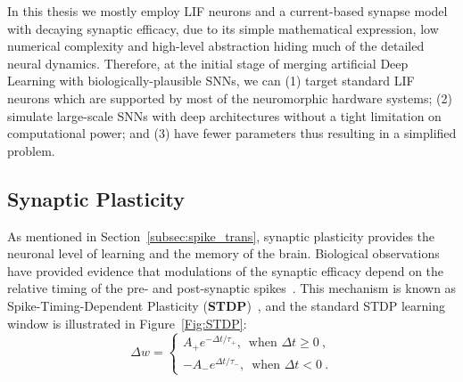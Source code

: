 In this thesis we mostly employ LIF neurons and a current-based synapse model with decaying synaptic efficacy, due to its simple mathematical expression, low numerical complexity and high-level abstraction hiding much of the detailed neural dynamics.
Therefore, at the initial stage of merging artificial Deep Learning with biologically-plausible SNNs, we can (1) target standard LIF neurons which are supported by most of the neuromorphic hardware systems; (2) simulate large-scale SNNs with deep architectures without a tight limitation on computational power; and (3) have fewer parameters thus resulting in a simplified problem.


\subsection{Synaptic Plasticity}
\label{subsec:STDP}
As mentioned in Section~\ref{subsec:spike_trans}, synaptic plasticity provides the neuronal level of learning and the memory of the brain.
Biological observations have provided evidence that modulations of the synaptic efficacy depend on the relative timing of the pre- and post-synaptic spikes~\citep{bi1998synaptic}.
This mechanism is known as Spike-Timing-Dependent Plasticity (\textbf{STDP})~\citep{song2000competitive}, and the standard STDP learning window is illustrated in Figure~\ref{Fig:STDP}:
\begin{equation}
\Delta w = \left\{
\begin{aligned}
A_+ e^{-\Delta t/\tau_+} \textrm{,~~when~} \Delta t \geq 0~, \\
{-A}_- e^{\Delta t/\tau_-} \textrm{,~~when~} \Delta t < 0~.
\end{aligned}
\right.
\label{equ:stdp}
\end{equation}

